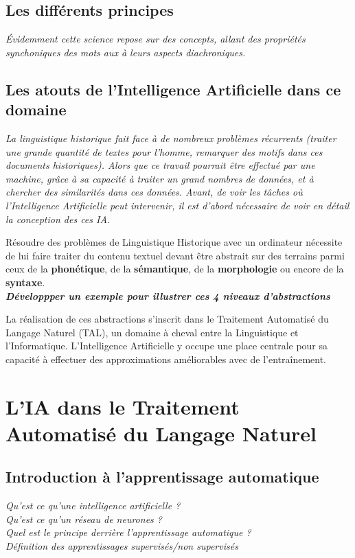 \documentclass[12pt, letterpaper, french]{report}
\begin{document}
\subsection{Les différents principes}
\textit{Évidemment cette science repose sur des concepts, allant des propriétés synchoniques des mots aux à leurs aspects diachroniques.}
\subsection{Les atouts de l'Intelligence Artificielle dans ce domaine}
\textit{La linguistique historique fait face à de nombreux problèmes récurrents (traiter une grande quantité de textes pour l'homme, remarquer des motifs dans ces documents historiques). Alors que ce travail pourrait être effectué par une machine, grâce à sa capacité à traiter un grand nombres de données, et à chercher des similarités dans ces données. Avant, de voir les tâches où l'Intelligence Artificielle peut intervenir, il est d'abord nécessaire de voir en détail la conception des ces IA.}

Résoudre des problèmes de Linguistique Historique avec un ordinateur nécessite de lui faire traiter
du contenu textuel devant être abstrait sur des terrains parmi ceux de la \textbf{phonétique}, de la
\textbf{sémantique}, de la \textbf{morphologie} ou encore de la \textbf{syntaxe}.\\
\textbf{\textit{Développper un exemple pour illustrer ces 4 niveaux d'abstractions}}

La réalisation de ces abstractions s'inscrit dans le Traitement Automatisé du Langage Naturel (TAL),
un domaine à cheval entre la Linguistique et l'Informatique. L'Intelligence Artificielle y occupe
une place centrale pour sa capacité à effectuer des approximations améliorables avec de l'entraînement.


\section{L'IA dans le Traitement Automatisé du Langage Naturel}
\subsection{Introduction à l'apprentissage automatique}
\textit{Qu'est ce qu'une intelligence artificielle ?\\
    Qu'est ce qu'un réseau de neurones ?\\
    Quel est le principe derrière l'apprentissage automatique ?\\
    Définition des apprentissages supervisés/non supervisés}
\end{document}
